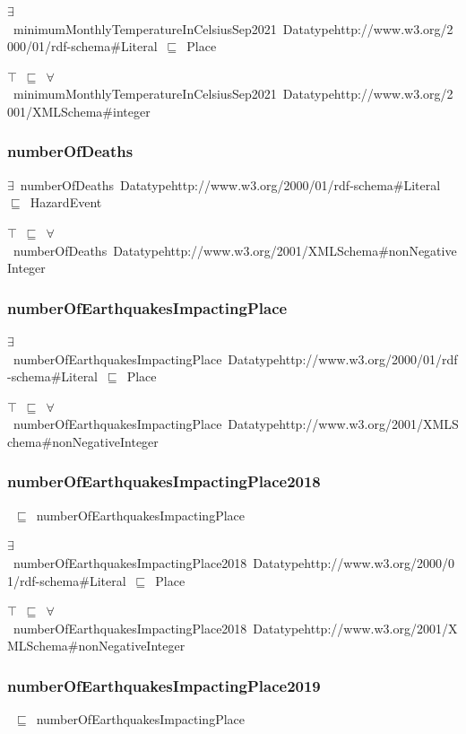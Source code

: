 \documentclass{article}
\begin{document}
\ensuremath{\exists}~minimumMonthlyTemperatureInCelsiusSep2021~Datatypehttp://www.w3.org/2000/01/rdf-schema#Literal~\ensuremath{\sqsubseteq}~Place

\ensuremath{\top}~\ensuremath{\sqsubseteq}~\ensuremath{\forall}~minimumMonthlyTemperatureInCelsiusSep2021~Datatypehttp://www.w3.org/2001/XMLSchema#integer

\subsubsection*{numberOfDeaths}

\ensuremath{\exists}~numberOfDeaths~Datatypehttp://www.w3.org/2000/01/rdf-schema#Literal~\ensuremath{\sqsubseteq}~HazardEvent

\ensuremath{\top}~\ensuremath{\sqsubseteq}~\ensuremath{\forall}~numberOfDeaths~Datatypehttp://www.w3.org/2001/XMLSchema#nonNegativeInteger

\subsubsection*{numberOfEarthquakesImpactingPlace}

\ensuremath{\exists}~numberOfEarthquakesImpactingPlace~Datatypehttp://www.w3.org/2000/01/rdf-schema#Literal~\ensuremath{\sqsubseteq}~Place

\ensuremath{\top}~\ensuremath{\sqsubseteq}~\ensuremath{\forall}~numberOfEarthquakesImpactingPlace~Datatypehttp://www.w3.org/2001/XMLSchema#nonNegativeInteger

\subsubsection*{numberOfEarthquakesImpactingPlace2018}

~\ensuremath{\sqsubseteq}~numberOfEarthquakesImpactingPlace

\ensuremath{\exists}~numberOfEarthquakesImpactingPlace2018~Datatypehttp://www.w3.org/2000/01/rdf-schema#Literal~\ensuremath{\sqsubseteq}~Place

\ensuremath{\top}~\ensuremath{\sqsubseteq}~\ensuremath{\forall}~numberOfEarthquakesImpactingPlace2018~Datatypehttp://www.w3.org/2001/XMLSchema#nonNegativeInteger

\subsubsection*{numberOfEarthquakesImpactingPlace2019}

~\ensuremath{\sqsubseteq}~numberOfEarthquakesImpactingPlace
\end{document}
